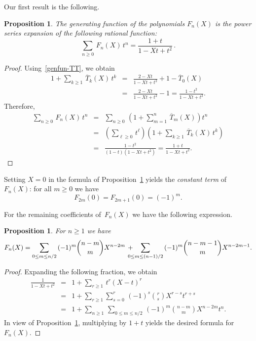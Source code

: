 \documentclass[11pt, a4paper]{amsart}
\newtheorem{prop}[theorem]{Proposition}
\theoremstyle{definition}
\newcommand\TT{\overline{T}}
\numberwithin{equation}{section}
\begin{document}
Our first result is the following.

\begin{prop}\label{prop-gfF}
The generating function of the polynomials $F_n(X)$ is the power series expansion of the following rational function:
\[
\sum_{n \geq 0} \,  F_n(X) \,  t^n = \frac{1+t}{1-Xt +t^2} \, . 
\]
\end{prop}

\begin{proof}
Using~\eqref{genfun-TT}, we obtain
\begin{eqnarray*}
1 + \sum_{k \geq 1} \, \TT_k (X) \, t^k & = & \frac{2 - Xt}{1 - Xt + t^2} + 1 - \TT_0(X) \\
& = & \frac{2 - Xt}{1 - Xt + t^2} - 1 =  \frac{1 - t^2}{1 - Xt + t^2} .
\end{eqnarray*}
Therefore, 
\begin{eqnarray*}
\sum_{n \geq 0} \,  F_n(X) \,  t^n 
& = & \sum_{n \geq 0} \, \left( 1 + \sum_{m=1}^n \, \TT_m(X) \right) t^n \\
& = & \left( \sum_{\ell \geq 0} \, t^{\ell} \right) \left( 1 + \sum_{k \geq 1} \, \TT_k (X) \, t^k \right) \\
& = & \frac{1 - t^2}{(1-t) (1 - Xt + t^2)} =  \frac{1 + t}{1 - Xt + t^2} .
\end{eqnarray*}
\end{proof}

Setting $X= 0$ in the formula of Proposition~\ref{prop-gfF} yields the \emph{constant term} of~$F_n(X)$:
for all $m \geq 0$ we have
\begin{equation*}\label{constant-F}
F_{2m}(0) = F_{2m+1}(0) = (-1)^m .
\end{equation*}

For the remaining coefficients of~$F_n(X)$ we have the following expression.

\begin{prop}\label{prop-Fn}
For $n\geq 1$ we have
\begin{equation*}
F_n(X) = \sum_{0 \leq m \leq n/2} \, (-1)^m \binom{n - m}{m} X^{n-2m} \, +  
\hskip -10pt \sum_{0 \leq m \leq (n-1)/2} \, (-1)^m  \binom{n - m - 1}{m} X^{n-2m-1}  .
\end{equation*}
\end{prop}


\begin{proof}
Expanding the following fraction, we obtain
\begin{eqnarray*}
\frac{1}{1-Xt +t^2} & = & 1 + \sum_{r \geq 1} \, t^r (X - t)^r \\
& = & 1 + \sum_{r \geq 1} \sum_{s = 0}^r \, (-1)^s \binom{r}{s} X^{r-s} t^{r+s} \\
& = & 1 + \sum_{n \geq 1} \, \sum_{0 \leq m \leq n/2} \, (-1)^m \binom{n-m}{m} X^{n-2m} t^n .
\end{eqnarray*}
In view of Proposition~\ref{prop-gfF}, 
multiplying by $1+t$ yields the desired formula for~$F_n(X)$.
\end{proof}
\end{document}
